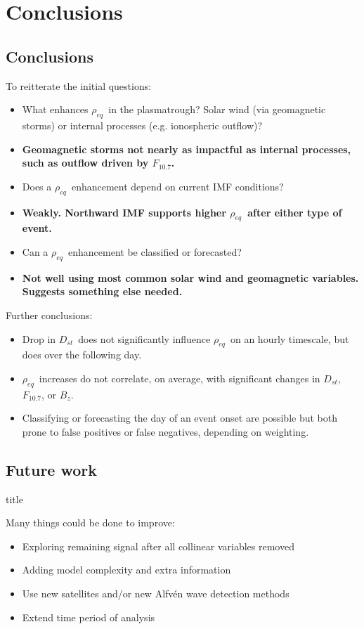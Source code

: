 \documentclass[xcolor={dvipsnames,table}]{beamer}
\newcommand{\subheader}{    		\begin{center}
  	\begin{beamercolorbox}[sep=4pt,center,shadow=true,rounded=true]{title}
  		\usebeamerfont{title}\subsecname\par%
  	\end{beamercolorbox}
  	\vfill
  	\end{center}}
\newcommand{\req}{\ensuremath{\rho_{eq}}} %
\newcommand{\dst}{\ensuremath{D_{st}}} %
\newcommand{\f}{\ensuremath{F_{10.7}}} %
\begin{document}
\section{Conclusions}
\subsection{Conclusions}
\begin{frame}
	To reitterate the initial questions:	
	\begin{itemize}
		\item What enhances \req\ in the plasmatrough? Solar wind (via geomagnetic storms) or internal processes (e.g. ionospheric outflow)?
		\item[] \textbf{Geomagnetic storms not nearly as impactful as internal processes, such as outflow driven by \f.}
		\item Does a \req\ enhancement depend on current IMF conditions?
		\item[] \textbf{Weakly. Northward IMF supports higher \req\ after either type of event.}
		\item Can a \req\ enhancement be classified or forecasted?
		\item[] \textbf{Not well using most common solar wind and geomagnetic variables. Suggests something else needed.}
	\end{itemize}
\end{frame}
\begin{frame}
	Further conclusions:
	\begin{itemize}
		\item Drop in \dst\ does not significantly influence \req\ on an hourly timescale, but does over the following day.
		\item \req\ increases do not correlate, on average, with significant changes in \dst, \f, or $B_z$.
		\item Classifying or forecasting the day of an event onset are possible but both prone to false positives or false negatives, depending on weighting.
	\end{itemize}
\end{frame}


\subsection{Future work}
\begin{frame}
	\subheader
	Many things could be done to improve:
	\begin{itemize}
		\item Exploring remaining signal after all collinear variables removed
		\item Adding model complexity and extra information
		\item Use new satellites and/or new Alfvén wave detection methods
		\item Extend time period of analysis
	\end{itemize}
\end{frame}
\end{document}
